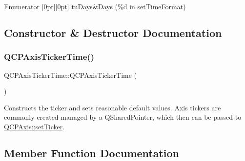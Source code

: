 \begin{DoxyEnumFields}{Enumerator}
[0pt][0pt]{}\mbox{\label{classQCPAxisTickerTime_a5c48ded8c6d3a1aca9b68219469fea3eaf9729e64545307a80a0e3527d6da6556}} 
tu\+Days&Days (\%d in \hyperlink{classQCPAxisTickerTime_a2f30b6e5125bce4256be9ce3177088ea}{set\+Time\+Format}) \\
\hline

\end{DoxyEnumFields}


\subsection{Constructor \& Destructor Documentation}
\mbox{\label{classQCPAxisTickerTime_a5145aac1d2117fdac411d9e8552cc41b}} 
\subsubsection{\texorpdfstring{Q\+C\+P\+Axis\+Ticker\+Time()}{QCPAxisTickerTime()}}
{\footnotesize\ttfamily Q\+C\+P\+Axis\+Ticker\+Time\+::\+Q\+C\+P\+Axis\+Ticker\+Time (\begin{DoxyParamCaption}{ }\end{DoxyParamCaption})}

Constructs the ticker and sets reasonable default values. Axis tickers are commonly created managed by a Q\+Shared\+Pointer, which then can be passed to \hyperlink{classQCPAxis_a4ee03fcd2c74d05cd1a419b9af5cfbdc}{Q\+C\+P\+Axis\+::set\+Ticker}. 

\subsection{Member Function Documentation}
\mbox{\label{classQCPAxisTickerTime_adc13e54fc969be98a5c0e3fa0dbaa293}} 
